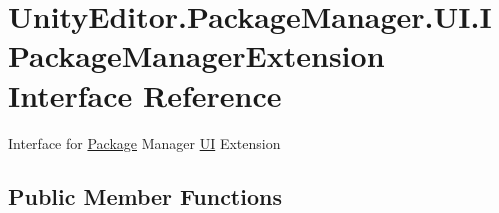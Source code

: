 \hypertarget{interface_unity_editor_1_1_package_manager_1_1_u_i_1_1_i_package_manager_extension}{}\section{Unity\+Editor.\+Package\+Manager.\+U\+I.\+I\+Package\+Manager\+Extension Interface Reference}
\label{interface_unity_editor_1_1_package_manager_1_1_u_i_1_1_i_package_manager_extension}


Interface for \mbox{\hyperlink{class_unity_editor_1_1_package_manager_1_1_u_i_1_1_package}{Package}} Manager \mbox{\hyperlink{namespace_unity_editor_1_1_package_manager_1_1_u_i}{UI}} Extension  


\subsection*{Public Member Functions}
